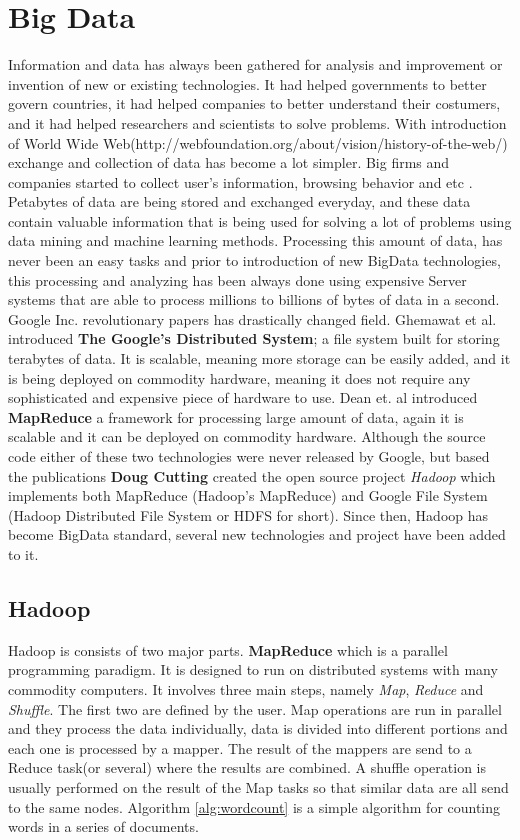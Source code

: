 \documentclass[english]{tktltiki}
\begin{document}
\section{Big Data}
Information and data has always been gathered for analysis and improvement or invention of new or existing technologies. It had helped governments to better govern countries, it had helped companies to better understand their costumers, and it had helped researchers and scientists to solve problems. With introduction of World Wide Web(http://webfoundation.org/about/vision/history-of-the-web/) exchange and collection of data has become a lot simpler. Big firms and companies started to collect user's information, browsing behavior and etc . Petabytes of data are being stored and exchanged everyday, and these data contain valuable information that is being used for solving a lot of problems using data mining and machine learning methods. 
Processing this amount of data, has never been an easy tasks and prior to introduction of new BigData technologies, this processing and analyzing has been always done using expensive Server systems that are able to process millions to billions of bytes of data in a second. 
Google Inc. revolutionary papers has drastically changed field. Ghemawat et al. \cite{ghemawat03} introduced \textbf{The Google's Distributed System}; a file system built for storing terabytes of data. It is scalable, meaning more storage can be easily added, and it is being deployed on commodity hardware, meaning it does not require any sophisticated and expensive piece of hardware to use. Dean et. al \cite{dean04} introduced \textbf{MapReduce} a framework for processing large amount of data, again it is scalable and it can be deployed on commodity hardware. 
Although the source code either of these two technologies were never released by Google, but based the publications \textbf{Doug Cutting} created the open source project \textit{Hadoop} which implements both MapReduce (Hadoop's MapReduce) and Google File System (Hadoop Distributed File System or HDFS for short). Since then, Hadoop has become BigData standard, several new technologies and project have been added to it.

\subsection{Hadoop}
Hadoop is consists of two major parts. 
\textbf{MapReduce} which is a parallel programming paradigm. It is designed to run on distributed systems with many commodity computers. It involves three main steps, namely \textit{Map}, \textit{Reduce} and \textit{Shuffle}. The first two are defined by the user. Map operations are run in parallel and they process the data individually, data is divided into different portions and each one is processed by a mapper. The result of the mappers are send to a Reduce task(or several) where the results are combined. A shuffle operation is usually performed on the result of the Map tasks so that similar data are all send to the same nodes. Algorithm \ref{alg:wordcount} is a simple algorithm for counting words in a series of documents. 
\end{document}
